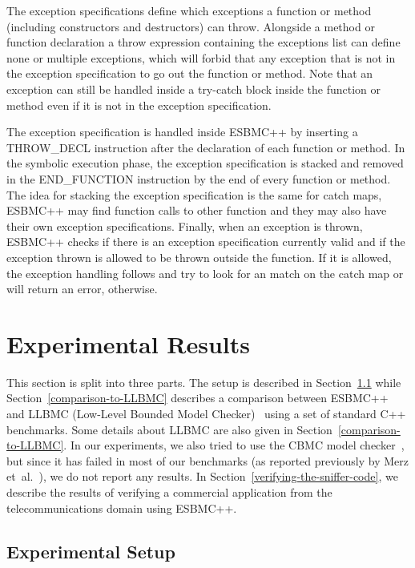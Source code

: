 \documentclass[conference]{IEEEtran}
\begin{document}
The exception specifications define which exceptions a
function or method (including constructors
and destructors) can throw. Alongside a method or
function declaration a throw expression containing
the exceptions list can define none or
multiple exceptions, which will forbid that
any exception that is not in the exception
specification to go out the function or method. Note
that an exception can still be handled inside
a try-catch block inside the function or method
even if it is not in the exception specification.

The exception specification is handled inside ESBMC++
by inserting a THROW\_DECL instruction after the declaration
of each function or method. In the symbolic execution phase,
the exception specification is stacked and removed in the
END\_FUNCTION instruction by the end of every
function or method. The idea for stacking the exception
specification is the same for catch maps, ESBMC++ may
find function calls to other
function and they may also have their own exception specifications.
Finally, when an exception is thrown, ESBMC++ checks if there is an
exception specification currently valid and if the exception thrown
is allowed to be thrown outside the function. If it is allowed, the
exception handling follows and try to look for an match on the catch
map or will return an error, otherwise.


\section{Experimental Results}
\label{experimental-results}

This section is split into three parts.
The setup is described in Section~\ref{experimental-setup}
while Section~\ref{comparison-to-LLBMC} describes a comparison
between ESBMC++~\cite{esbmc12} and
LLBMC (Low-Level Bounded Model Checker)~\cite{llbmc12}
using a set of standard C++ benchmarks. Some details about LLBMC
are also given in Section~\ref{comparison-to-LLBMC}.
In our experiments, we also tried to use the CBMC model checker~\cite{Clarke04},
but since it has failed in most of our benchmarks (as reported previously
by Merz et~al.~\cite{Florian12}), we do not report any results.
In Section~\ref{verifying-the-sniffer-code}, we describe the results of 
verifying a commercial application from the telecommunications domain using ESBMC++.

\subsection{Experimental Setup}
\label{experimental-setup}
\end{document}
